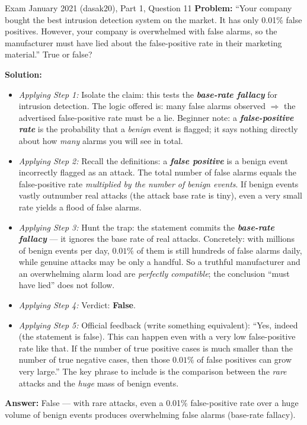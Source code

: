 \documentclass[12pt, a4paper]{article}
\newcommand{\term}[1]{\textbf{\textit{#1}}}        %
\begin{document}
\begin{practicebox}{Exam January 2021 (dasak20), Part 1, Question 11}
\textbf{Problem:} ``Your company bought the best intrusion detection system on the market. It has only 0.01\% false positives. However, your company is overwhelmed with false alarms, so the manufacturer must have lied about the false-positive rate in their marketing material.'' True or false?

\textbf{Solution:}
\begin{itemize}
    \item \textit{Applying Step 1:} Isolate the claim: this tests the \term{base-rate fallacy} for intrusion detection. The logic offered is: many false alarms observed $\Rightarrow$ the advertised false-positive rate must be a lie. Beginner note: a \term{false-positive rate} is the probability that a \emph{benign} event is flagged; it says nothing directly about how \emph{many} alarms you will see in total.
    \item \textit{Applying Step 2:} Recall the definitions: a \term{false positive} is a benign event incorrectly flagged as an attack. The total number of false alarms equals the false-positive rate \emph{multiplied by the number of benign events}. If benign events vastly outnumber real attacks (the attack base rate is tiny), even a very small rate yields a flood of false alarms.
    \item \textit{Applying Step 3:} Hunt the trap: the statement commits the \term{base-rate fallacy} --- it ignores the base rate of real attacks. Concretely: with millions of benign events per day, $0.01\%$ of them is still hundreds of false alarms daily, while genuine attacks may be only a handful. So a truthful manufacturer and an overwhelming alarm load are \emph{perfectly compatible}; the conclusion ``must have lied'' does not follow.
    \item \textit{Applying Step 4:} Verdict: \textbf{False}.
    \item \textit{Applying Step 5:} Official feedback (write something equivalent): ``Yes, indeed (the statement is false). This can happen even with a very low false-positive rate like that. If the number of true positive cases is much smaller than the number of true negative cases, then those $0.01\%$ of false positives can grow very large.'' The key phrase to include is the comparison between the \emph{rare} attacks and the \emph{huge} mass of benign events.
\end{itemize}
\textbf{Answer:} False --- with rare attacks, even a 0.01\% false-positive rate over a huge volume of benign events produces overwhelming false alarms (base-rate fallacy).
\end{practicebox}
\end{document}
